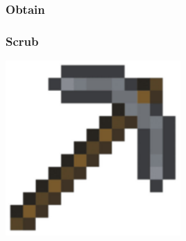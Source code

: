 \documentclass[xcolor=dvipsnames, 9pt]{beamer}
\begin{document}
{
\begin{frame}
    \frametitle{Obtain}
\end{frame}
}

\begin{frame}
    \frametitle{Scrub}
    \begin{center}
   \includegraphics[width=0.5\textwidth]{pickaxe.png}
    \end{center}
\end{frame}
\end{document}

